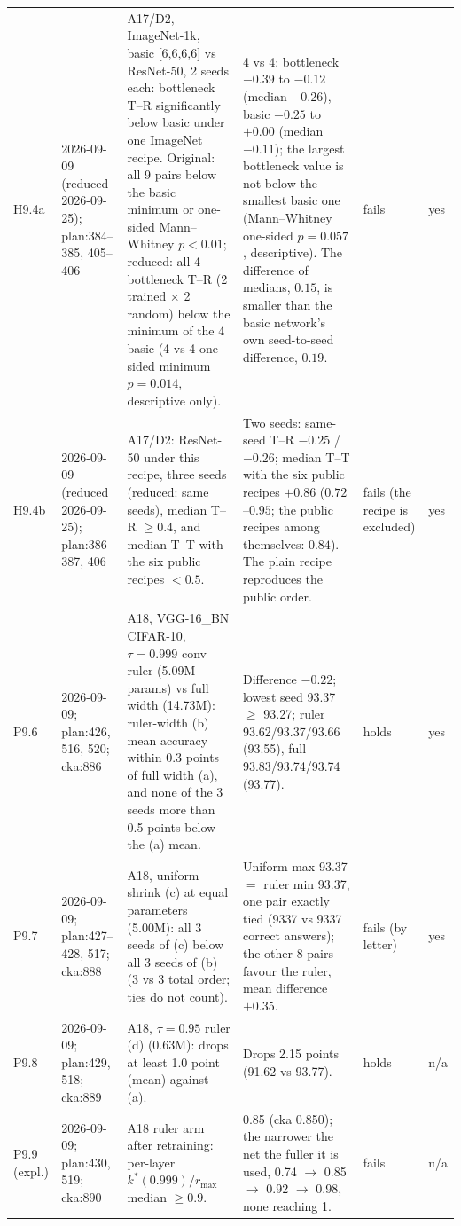 \begin{longtable}{p{1.1cm}p{1.4cm}p{6.2cm}p{4.6cm}p{2.0cm}p{1.6cm}}
H9.4a & 2026-09-09 (reduced 2026-09-25); plan:384--385, 405--406 & A17/D2, ImageNet-1k, basic [6,6,6,6] vs ResNet-50, 2 seeds each: bottleneck T--R significantly below basic under one ImageNet recipe. Original: all 9 pairs below the basic minimum or one-sided Mann--Whitney $p<0.01$; reduced: all 4 bottleneck T--R (2 trained $\times$ 2 random) below the minimum of the 4 basic (4 vs 4 one-sided minimum $p=0.014$, descriptive only). & 4 vs 4: bottleneck $-0.39$ to $-0.12$ (median $-0.26$), basic $-0.25$ to $+0.00$ (median $-0.11$); the largest bottleneck value is not below the smallest basic one (Mann--Whitney one-sided $p=0.057$, descriptive). The difference of medians, $0.15$, is smaller than the basic network's own seed-to-seed difference, $0.19$. & fails & yes \\
H9.4b & 2026-09-09 (reduced 2026-09-25); plan:386--387, 406 & A17/D2: ResNet-50 under this recipe, three seeds (reduced: same seeds), median T--R $\ge 0.4$, and median T--T with the six public recipes $< 0.5$. & Two seeds: same-seed T--R $-0.25$ / $-0.26$; median T--T with the six public recipes $+0.86$ ($0.72$--$0.95$; the public recipes among themselves: $0.84$). The plain recipe reproduces the public order. & fails (the recipe is excluded) & yes \\
P9.6 & 2026-09-09; plan:426, 516, 520; cka:886 & A18, VGG-16\_BN CIFAR-10, $\tau=0.999$ conv ruler (5.09M params) vs full width (14.73M): ruler-width (b) mean accuracy within 0.3 points of full width (a), and none of the 3 seeds more than 0.5 points below the (a) mean. & Difference $-0.22$; lowest seed 93.37 $\ge$ 93.27; ruler 93.62/93.37/93.66 (93.55), full 93.83/93.74/93.74 (93.77). & holds & yes \\
P9.7 & 2026-09-09; plan:427--428, 517; cka:888 & A18, uniform shrink (c) at equal parameters (5.00M): all 3 seeds of (c) below all 3 seeds of (b) (3 vs 3 total order; ties do not count). & Uniform max 93.37 $=$ ruler min 93.37, one pair exactly tied (9337 vs 9337 correct answers); the other 8 pairs favour the ruler, mean difference $+0.35$. & fails (by letter) & yes \\
P9.8 & 2026-09-09; plan:429, 518; cka:889 & A18, $\tau=0.95$ ruler (d) (0.63M): drops at least 1.0 point (mean) against (a). & Drops 2.15 points (91.62 vs 93.77). & holds & n/a \\
P9.9 (expl.) & 2026-09-09; plan:430, 519; cka:890 & A18 ruler arm after retraining: per-layer $k^*(0.999)/r_{\max}$ median $\ge 0.9$. & 0.85 (cka 0.850); the narrower the net the fuller it is used, 0.74 $\to$ 0.85 $\to$ 0.92 $\to$ 0.98, none reaching 1. & fails & n/a \\

\end{longtable}
